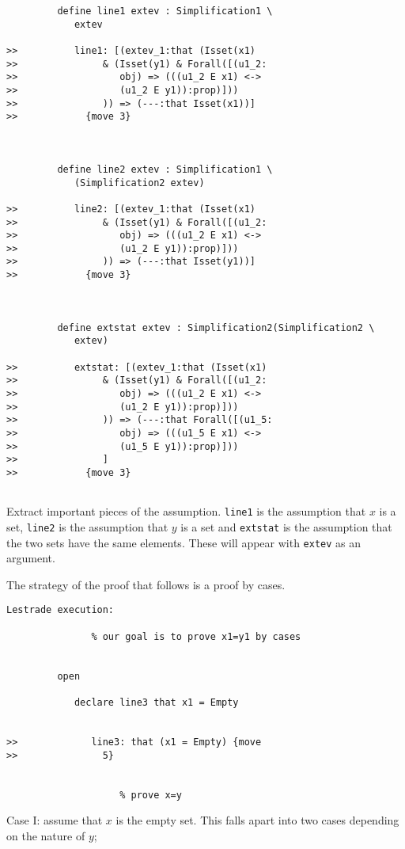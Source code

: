 \documentclass{article}
\begin{document}
{\begin{verbatim}
         define line1 extev : Simplification1 \
            extev

>>          line1: [(extev_1:that (Isset(x1)
>>               & (Isset(y1) & Forall([(u1_2:
>>                  obj) => (((u1_2 E x1) <->
>>                  (u1_2 E y1)):prop)]))
>>               )) => (---:that Isset(x1))]
>>            {move 3}



         define line2 extev : Simplification1 \
            (Simplification2 extev)

>>          line2: [(extev_1:that (Isset(x1)
>>               & (Isset(y1) & Forall([(u1_2:
>>                  obj) => (((u1_2 E x1) <->
>>                  (u1_2 E y1)):prop)]))
>>               )) => (---:that Isset(y1))]
>>            {move 3}



         define extstat extev : Simplification2(Simplification2 \
            extev)

>>          extstat: [(extev_1:that (Isset(x1)
>>               & (Isset(y1) & Forall([(u1_2:
>>                  obj) => (((u1_2 E x1) <->
>>                  (u1_2 E y1)):prop)]))
>>               )) => (---:that Forall([(u1_5:
>>                  obj) => (((u1_5 E x1) <->
>>                  (u1_5 E y1)):prop)]))
>>               ]
>>            {move 3}


\end{verbatim}


Extract important pieces of the assumption.  {\tt line1} is the assumption that $x$ is a set, {\tt line2} is the assumption that $y$ is a set
and {\tt extstat} is the assumption that the two sets have the same elements.  These will appear with {\tt extev} as an argument.

The strategy of the proof that follows is a proof by cases.

\begin{verbatim}Lestrade execution:

               % our goal is to prove x1=y1 by cases


         open

            declare line3 that x1 = Empty


>>             line3: that (x1 = Empty) {move
>>               5}


                    % prove x=y

\end{verbatim}

Case I:  assume that $x$ is the empty set.  This falls apart into two cases depending on the nature of $y$;

}
\end{document}
